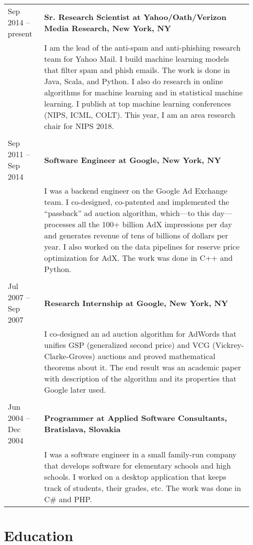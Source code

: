 \documentclass[9pt]{article}
\newcommand{\smallfont}{\small}
\begin{document}
\begin{longtable}{@{}lp{13cm}}
Sep 2014 -- present & \textbf{Sr. Research Scientist at Yahoo/Oath/Verizon Media Research, New York, NY} \\
& {\smallfont I am the lead of the anti-spam and anti-phishing research team for
Yahoo Mail. I build machine learning models that filter spam and phish emails.
The work is done in Java, Scala, and Python. I also do research in online
algorithms for machine learning and in statistical machine learning. I publish
at top machine learning conferences (NIPS, ICML, COLT). This year, I am an area
research chair for NIPS 2018.} \\
\\
Sep 2011 -- Sep 2014 & \textbf{Software Engineer at Google, New York, NY} \\
& {\smallfont I was a backend engineer on the Google Ad Exchange team. I
co-designed, co-patented and implemented the ``passback'' ad auction algorithm,
which---to this day---processes all the 100+ billion AdX impressions per day and
generates revenue of tens of billions of dollars per year. I also worked on the
data pipelines for reserve price optimization for AdX. The work was done in C++
and Python.} \\
\\
Jul 2007 -- Sep 2007 & \textbf{Research Internship at Google, New York, NY} \\
& {\smallfont I co-designed an ad auction algorithm for AdWords that unifies GSP
(generalized second price) and VCG (Vickrey-Clarke-Groves) auctions and proved
mathematical theorems about it. The end result was an academic paper with description
of the algorithm and its properties that Google later used.} \\
\\
Jun 2004 -- Dec 2004 & \textbf{Programmer at Applied Software Consultants, Bratislava, Slovakia} \\
& {\smallfont I was a software engineer in a small family-run company that
develops software for elementary schools and high schools. I worked on a desktop
application that keeps track of students, their grades, etc. The work was done in
C\# and PHP.} \\
\end{longtable}

\clearpage

\section*{Education}
\end{document}
